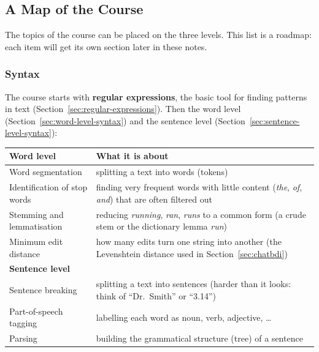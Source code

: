 \subsection{A Map of the Course}
\label{sec:course-map}

The topics of the course can be placed on the three levels. This list is a roadmap: each
item will get its own section later in these notes.

\subsubsection{Syntax}

The course starts with \textbf{regular expressions}, the basic tool for finding
patterns in text (Section~\ref{sec:regular-expressions}). Then the word level
(Section~\ref{sec:word-level-syntax}) and the sentence level
(Section~\ref{sec:sentence-level-syntax}):

\begin{center}
\small
\begin{tabularx}{\linewidth}{@{}>{\raggedright\arraybackslash}p{4.2cm} X@{}}
\toprule
\textbf{Word level} & \textbf{What it is about} \\
\midrule
Word segmentation & splitting a text into words (tokens) \\
Identification of stop words & finding very frequent words with little content
  (\emph{the}, \emph{of}, \emph{and}) that are often filtered out \\
Stemming and lemmatisation & reducing \emph{running}, \emph{ran}, \emph{runs} to a common
  form (a crude stem or the dictionary lemma \emph{run}) \\
Minimum edit distance & how many edits turn one string into another (the Levenshtein
  distance used in Section~\ref{sec:chatbdi}) \\
\midrule
\textbf{Sentence level} & \\
\midrule
Sentence breaking & splitting a text into sentences (harder than it looks: think of
  ``Dr.\ Smith'' or ``3.14'') \\
Part-of-speech tagging & labelling each word as noun, verb, adjective, \ldots \\
Parsing & building the grammatical structure (tree) of a sentence \\
\bottomrule
\end{tabularx}
\end{center}

